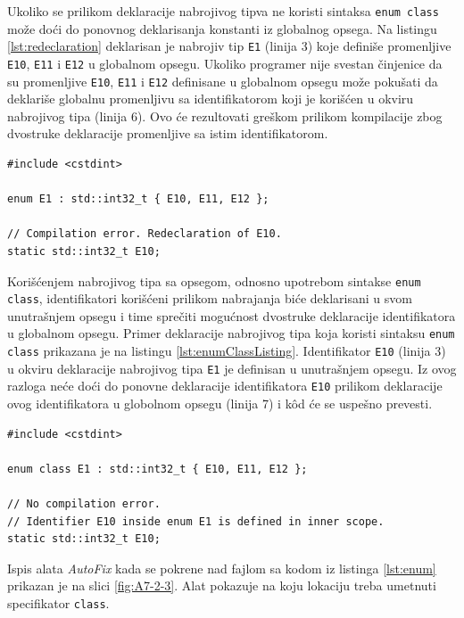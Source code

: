 \documentclass[12pt,oneside]{memoir}
\begin{document}
Ukoliko se prilikom deklaracije nabrojivog tipva ne koristi sintaksa \texttt{enum class} mo\v{z}e do\'{c}i do ponovnog deklarisanja konstanti iz
globalnog opsega. Na listingu \ref{lst:redeclaration} deklarisan je nabrojiv tip \texttt{E1} (linija 3) koje defini\v{s}e promenljive \texttt{E10}, \texttt{E11}
i \texttt{E12} u globalnom opsegu. Ukoliko programer nije svestan \v{c}injenice da su promenljive \texttt{E10}, \texttt{E11}
i \texttt{E12} definisane u globalnom opsegu mo\v{z}e poku\v{s}ati da deklari\v{s}e globalnu promenljivu sa identifikatorom koji je kori\v{s}\'{c}en u okviru nabrojivog tipa (linija 6). Ovo \'{c}e rezultovati gre\v{s}kom prilikom kompilacije zbog dvostruke deklaracije promenljive sa istim identifikatorom.

\begin{lstlisting}[style=customc, caption={Primer koda u okviru kog dolazi do dvostruke deklaracije promenljive sa istim identifikatorom.}, label=lst:redeclaration]
#include <cstdint>

enum E1 : std::int32_t { E10, E11, E12 };

// Compilation error. Redeclaration of E10.
static std::int32_t E10; 
\end{lstlisting}
Kori\v{s}\'{c}enjem nabrojivog tipa sa opsegom, odnosno upotrebom sintakse \texttt{enum class}, identifikatori kori\v{s}\'{c}eni prilikom
nabrajanja bi\'{c}e deklarisani u svom unutra\v{s}njem opsegu i time spre\v{c}iti mogu\'{c}nost dvostruke deklaracije identifikatora u globalnom opsegu. Primer deklaracije nabrojivog tipa koja koristi sintaksu \texttt{enum class} prikazana je na listingu \ref{lst:enumClassListing}. Identifikator \texttt{E10} (linija 3)
u okviru deklaracije nabrojivog tipa \texttt{E1} je definisan u unutra\v{s}njem opsegu. Iz ovog razloga ne\'{c}e do\'{c}i do ponovne deklaracije identifikatora
\texttt{E10} prilikom deklaracije ovog identifikatora u globolnom opsegu (linija 7) i k\^{o}d \'{c}e se uspe\v{s}no prevesti.

\begin{lstlisting}[style=customc, caption={Primer upotrebe sintakse \texttt{enum class}.}, label=lst:enumClassListing]
#include <cstdint>

enum class E1 : std::int32_t { E10, E11, E12 };

// No compilation error. 
// Identifier E10 inside enum E1 is defined in inner scope.
static std::int32_t E10; 
\end{lstlisting}


Ispis alata \textit{AutoFix} kada se pokrene nad fajlom sa kodom iz listinga \ref{lst:enum} prikazan je na slici \ref{fig:A7-2-3}. 
Alat pokazuje na koju lokaciju treba umetnuti specifikator \texttt{class}.
\\
\end{document}
